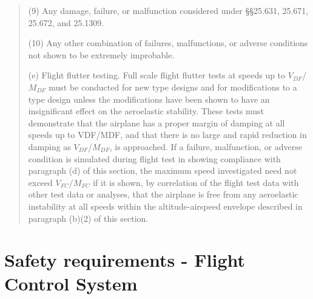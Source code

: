 \begin{quotation}
\begin{scriptsize}
(9) Any damage, failure, or malfunction considered under §§25.631, 25.671, 25.672, and 25.1309.

(10) Any other combination of failures, malfunctions, or adverse conditions not shown to be extremely improbable.

(e) Flight flutter testing. Full scale flight flutter tests at speeds up to $V_{DF}$/$M_{DF}$ must be conducted for new type designs and for modifications to a type design unless the modifications have been shown to have an insignificant effect on the aeroelastic stability. These tests must demonstrate that the airplane has a proper margin of damping at all speeds up to VDF/MDF, and that there is no large and rapid reduction in damping as $V_{DF}$/$M_{DF}$, is approached. If a failure, malfunction, or adverse condition is simulated during flight test in showing compliance with paragraph (d) of this section, the maximum speed investigated need not exceed $V_{FC}$/$M_{FC}$ if it is shown, by correlation of the flight test data with other test data or analyses, that the airplane is free from any aeroelastic instability at all speeds within the altitude-airspeed envelope described in paragraph (b)(2) of this section.
\end{scriptsize}
\end{quotation}

\section{Safety requirements - Flight Control System}

